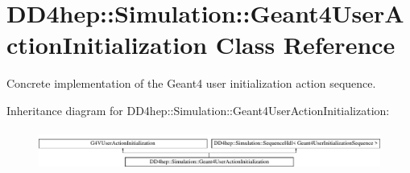\hypertarget{class_d_d4hep_1_1_simulation_1_1_geant4_user_action_initialization}{}\section{D\+D4hep\+:\+:Simulation\+:\+:Geant4\+User\+Action\+Initialization Class Reference}
\label{class_d_d4hep_1_1_simulation_1_1_geant4_user_action_initialization}


Concrete implementation of the Geant4 user initialization action sequence.  


Inheritance diagram for D\+D4hep\+:\+:Simulation\+:\+:Geant4\+User\+Action\+Initialization\+:\begin{figure}[H]
\begin{center}
\leavevmode
\includegraphics[height=1.330166cm]{class_d_d4hep_1_1_simulation_1_1_geant4_user_action_initialization}
\end{center}
\end{figure}
